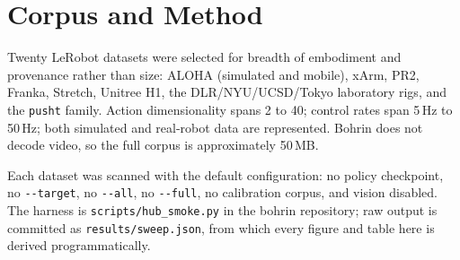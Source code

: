\documentclass[10pt,a4paper]{article}
\begin{document}
\section{Corpus and Method}

Twenty LeRobot datasets were selected for breadth of embodiment and provenance rather than
size: ALOHA (simulated and mobile), xArm, PR2, Franka, Stretch, Unitree H1, the
DLR/NYU/UCSD/Tokyo laboratory rigs, and the \texttt{pusht} family. Action dimensionality
spans 2 to 40; control rates span 5\,Hz to 50\,Hz; both simulated and real-robot data are
represented. Bohrin does not decode video, so the full corpus is approximately 50\,MB.

Each dataset was scanned with the default configuration: no policy checkpoint, no
\texttt{-{}-target}, no \texttt{-{}-all}, no \texttt{-{}-full}, no calibration corpus, and
vision disabled. The harness is \texttt{scripts/hub\_smoke.py} in the bohrin repository;
raw output is committed as \texttt{results/sweep.json}, from which every figure and table
here is derived programmatically.
\end{document}
